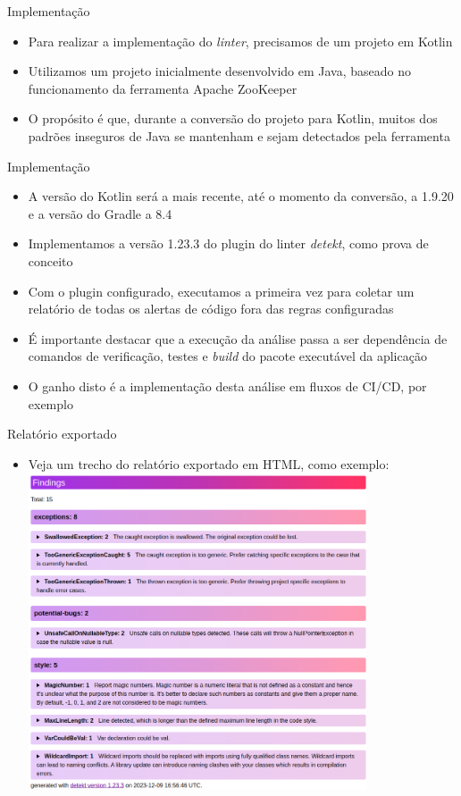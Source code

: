 \documentclass[brazilian]{beamer}
\begin{document}
\begin{frame}{Implementação}
    \begin{itemize}
        \item Para realizar a implementação do \textit{linter}, precisamos de um projeto em Kotlin
        \item Utilizamos um projeto inicialmente desenvolvido em Java, baseado no funcionamento da ferramenta Apache ZooKeeper
        \item O propósito é que, durante a conversão do projeto para Kotlin, muitos dos padrões inseguros de Java se mantenham e sejam detectados pela ferramenta
    \end{itemize}
\end{frame}

\begin{frame}{Implementação}
    \begin{itemize}
        \item A versão do Kotlin será a mais recente, até o momento da conversão, a 1.9.20 e a versão do Gradle a 8.4
        \item Implementamos a versão 1.23.3 do plugin do linter \emph{detekt}, como prova de conceito
        \item Com o plugin configurado, executamos a primeira vez para coletar um relatório de todas os alertas de código fora das regras configuradas
        \item É importante destacar que a execução da análise passa a ser dependência de comandos de verificação, testes e \textit{build} do pacote executável da aplicação
        \item O ganho disto é a implementação desta análise em fluxos de CI/CD, por exemplo
    \end{itemize}
\end{frame}

\begin{frame}{Relatório exportado}
    \begin{itemize}
        \item Veja um trecho do relatório exportado em HTML, como exemplo:
        \centering
        \includegraphics[width=10cm]{report_findings}
    \end{itemize}
\end{frame}
\end{document}
